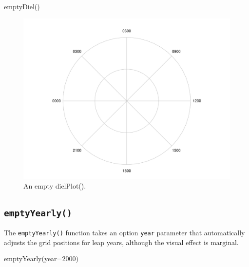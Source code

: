 \documentclass[
]{book}
\newenvironment{Shaded}{\begin{snugshade}}{\end{snugshade}}
\newcommand{\AttributeTok}[1]{\textcolor[rgb]{0.77,0.63,0.00}{#1}}
\newcommand{\DecValTok}[1]{\textcolor[rgb]{0.00,0.00,0.81}{#1}}
\newcommand{\FunctionTok}[1]{\textcolor[rgb]{0.00,0.00,0.00}{#1}}
\newcommand{\NormalTok}[1]{#1}
\begin{document}
\begin{Shaded}
\begin{Highlighting}[]
\FunctionTok{emptyDiel}\NormalTok{()}
\end{Highlighting}
\end{Shaded}

\begin{figure}

{\centering \includegraphics[width=0.9\linewidth]{_main_files/figure-latex/emptyDiel-1} 

}

\caption{An empty dielPlot().}\label{fig:emptyDiel}
\end{figure}

\hypertarget{emptyyearly}{%
\subsection{\texorpdfstring{\texttt{emptyYearly()}}{emptyYearly()}}\label{emptyyearly}}

The \texttt{emptyYearly()} function takes an option \texttt{year} parameter that automatically adjusts the grid positions for leap years, although the visual effect is marginal.

\begin{Shaded}
\begin{Highlighting}[]
\FunctionTok{emptyYearly}\NormalTok{(}\AttributeTok{year=}\DecValTok{2000}\NormalTok{)}
\end{Highlighting}
\end{Shaded}
\end{document}
